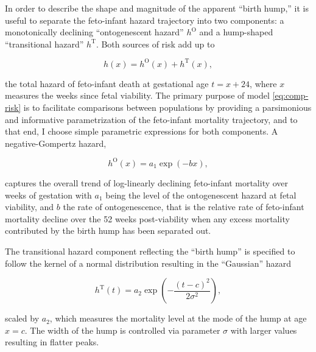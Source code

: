 \documentclass[10pt, twoside]{article}
\begin{document}
In order to describe the shape and magnitude of the apparent ``birth hump,'' it is useful to separate the feto-infant hazard trajectory into two components: a monotonically declining ``ontogenescent hazard'' \(h^\mathrm{O}\) and a hump-shaped ``transitional hazard'' \(h^\mathrm{T}\). Both sources of risk add up to

\begin{equation}
h(x) = h^\mathrm{O}(x) + h^\mathrm{T}(x),
\label{eq:comp-risk}
\end{equation}

the total hazard of feto-infant death at gestational age \(t=x+24\), where \(x\) measures the weeks since fetal viability. The primary purpose of model \eqref{eq:comp-risk} is to facilitate comparisons between populations by providing a parsimonious and informative parametrization of the feto-infant mortality trajectory, and to that end, I choose simple parametric expressions for both components. A negative-Gompertz hazard,

\[
h^\mathrm{O}(x) = a_1\exp(-bx),
\]

captures the overall trend of log-linearly declining feto-infant mortality over weeks of gestation with \(a_1\) being the level of the ontogenescent hazard at fetal viability, and \(b\) the rate of ontogenescence, that is the relative rate of feto-infant mortality decline over the 52 weeks post-viability when any excess mortality contributed by the birth hump has been separated out.

The transitional hazard component reflecting the ``birth hump'' is specified to follow the kernel of a normal distribution resulting in the ``Gaussian'' hazard

\[
h^\mathrm{T}(t) = a_2 \exp\left(-\frac{(t-c)^2} {2\sigma^2}\right),
\]

scaled by \(a_2\), which measures the mortality level at the mode of the hump at age \(x=c\). The width of the hump is controlled via parameter \(\sigma\) with larger values resulting in flatter peaks.
\end{document}
